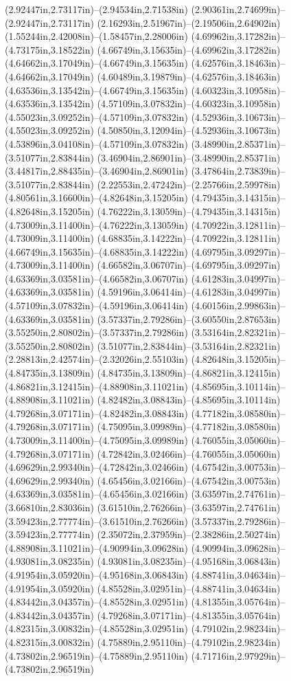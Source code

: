 (2.92447in,2.73117in)--(2.94534in,2.71538in) (2.90361in,2.74699in)--(2.92447in,2.73117in) (2.16293in,2.51967in)--(2.19506in,2.64902in) (1.55244in,2.42008in)--(1.58457in,2.28006in) (4.69962in,3.17282in)--(4.73175in,3.18522in) (4.66749in,3.15635in)--(4.69962in,3.17282in) (4.64662in,3.17049in)--(4.66749in,3.15635in) (4.62576in,3.18463in)--(4.64662in,3.17049in) (4.60489in,3.19879in)--(4.62576in,3.18463in) (4.63536in,3.13542in)--(4.66749in,3.15635in) (4.60323in,3.10958in)--(4.63536in,3.13542in) (4.57109in,3.07832in)--(4.60323in,3.10958in) (4.55023in,3.09252in)--(4.57109in,3.07832in) (4.52936in,3.10673in)--(4.55023in,3.09252in) (4.50850in,3.12094in)--(4.52936in,3.10673in) (4.53896in,3.04108in)--(4.57109in,3.07832in) (3.48990in,2.85371in)--(3.51077in,2.83844in) (3.46904in,2.86901in)--(3.48990in,2.85371in) (3.44817in,2.88435in)--(3.46904in,2.86901in) (3.47864in,2.73839in)--(3.51077in,2.83844in) (2.22553in,2.47242in)--(2.25766in,2.59978in) (4.80561in,3.16600in)--(4.82648in,3.15205in) (4.79435in,3.14315in)--(4.82648in,3.15205in) (4.76222in,3.13059in)--(4.79435in,3.14315in) (4.73009in,3.11400in)--(4.76222in,3.13059in) (4.70922in,3.12811in)--(4.73009in,3.11400in) (4.68835in,3.14222in)--(4.70922in,3.12811in) (4.66749in,3.15635in)--(4.68835in,3.14222in) (4.69795in,3.09297in)--(4.73009in,3.11400in) (4.66582in,3.06707in)--(4.69795in,3.09297in) (4.63369in,3.03581in)--(4.66582in,3.06707in) (4.61283in,3.04997in)--(4.63369in,3.03581in) (4.59196in,3.06414in)--(4.61283in,3.04997in) (4.57109in,3.07832in)--(4.59196in,3.06414in) (4.60156in,2.99863in)--(4.63369in,3.03581in) (3.57337in,2.79286in)--(3.60550in,2.87653in) (3.55250in,2.80802in)--(3.57337in,2.79286in) (3.53164in,2.82321in)--(3.55250in,2.80802in) (3.51077in,2.83844in)--(3.53164in,2.82321in) (2.28813in,2.42574in)--(2.32026in,2.55103in) (4.82648in,3.15205in)--(4.84735in,3.13809in) (4.84735in,3.13809in)--(4.86821in,3.12415in) (4.86821in,3.12415in)--(4.88908in,3.11021in) (4.85695in,3.10114in)--(4.88908in,3.11021in) (4.82482in,3.08843in)--(4.85695in,3.10114in) (4.79268in,3.07171in)--(4.82482in,3.08843in) (4.77182in,3.08580in)--(4.79268in,3.07171in) (4.75095in,3.09989in)--(4.77182in,3.08580in) (4.73009in,3.11400in)--(4.75095in,3.09989in) (4.76055in,3.05060in)--(4.79268in,3.07171in) (4.72842in,3.02466in)--(4.76055in,3.05060in) (4.69629in,2.99340in)--(4.72842in,3.02466in) (4.67542in,3.00753in)--(4.69629in,2.99340in) (4.65456in,3.02166in)--(4.67542in,3.00753in) (4.63369in,3.03581in)--(4.65456in,3.02166in) (3.63597in,2.74761in)--(3.66810in,2.83036in) (3.61510in,2.76266in)--(3.63597in,2.74761in) (3.59423in,2.77774in)--(3.61510in,2.76266in) (3.57337in,2.79286in)--(3.59423in,2.77774in) (2.35072in,2.37959in)--(2.38286in,2.50274in) (4.88908in,3.11021in)--(4.90994in,3.09628in) (4.90994in,3.09628in)--(4.93081in,3.08235in) (4.93081in,3.08235in)--(4.95168in,3.06843in) (4.91954in,3.05920in)--(4.95168in,3.06843in) (4.88741in,3.04634in)--(4.91954in,3.05920in) (4.85528in,3.02951in)--(4.88741in,3.04634in) (4.83442in,3.04357in)--(4.85528in,3.02951in) (4.81355in,3.05764in)--(4.83442in,3.04357in) (4.79268in,3.07171in)--(4.81355in,3.05764in) (4.82315in,3.00832in)--(4.85528in,3.02951in) (4.79102in,2.98234in)--(4.82315in,3.00832in) (4.75889in,2.95110in)--(4.79102in,2.98234in) (4.73802in,2.96519in)--(4.75889in,2.95110in) (4.71716in,2.97929in)--(4.73802in,2.96519in) 